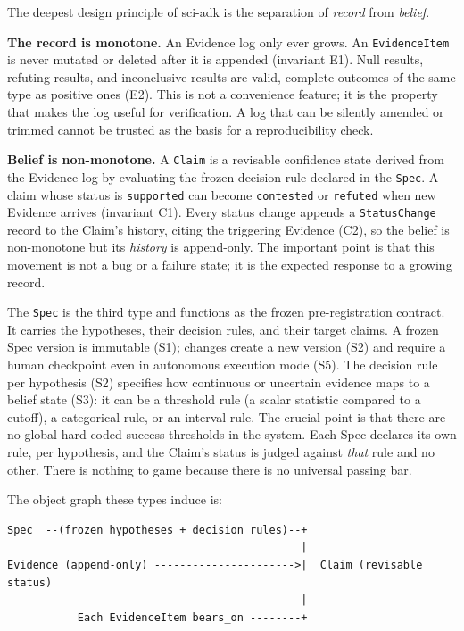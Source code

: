 \documentclass[11pt]{article}
\begin{document}
The deepest design principle of sci-adk is the separation of \textit{record} from \textit{belief}.

\textbf{The record is monotone.} An Evidence log only ever grows. An \texttt{EvidenceItem} is never mutated or deleted after it is appended (invariant E1). Null results, refuting results, and inconclusive results are valid, complete outcomes of the same type as positive ones (E2). This is not a convenience feature; it is the property that makes the log useful for verification. A log that can be silently amended or trimmed cannot be trusted as the basis for a reproducibility check.

\textbf{Belief is non-monotone.} A \texttt{Claim} is a revisable confidence state derived from the Evidence log by evaluating the frozen decision rule declared in the \texttt{Spec}. A claim whose status is \texttt{supported} can become \texttt{contested} or \texttt{refuted} when new Evidence arrives (invariant C1). Every status change appends a \texttt{StatusChange} record to the Claim's history, citing the triggering Evidence (C2), so the belief is non-monotone but its \textit{history} is append-only. The important point is that this movement is not a bug or a failure state; it is the expected response to a growing record.

The \texttt{Spec} is the third type and functions as the frozen pre-registration contract. It carries the hypotheses, their decision rules, and their target claims. A frozen Spec version is immutable (S1); changes create a new version (S2) and require a human checkpoint even in autonomous execution mode (S5). The decision rule per hypothesis (S2) specifies how continuous or uncertain evidence maps to a belief state (S3): it can be a threshold rule (a scalar statistic compared to a cutoff), a categorical rule, or an interval rule. The crucial point is that there are no global hard-coded success thresholds in the system. Each Spec declares its own rule, per hypothesis, and the Claim's status is judged against \textit{that} rule and no other. There is nothing to game because there is no universal passing bar.

The object graph these types induce is:

\begin{Verbatim}
Spec  --(frozen hypotheses + decision rules)--+
                                              |
Evidence (append-only) ---------------------->|  Claim (revisable status)
                                              |
           Each EvidenceItem bears_on --------+
\end{Verbatim}
\end{document}
